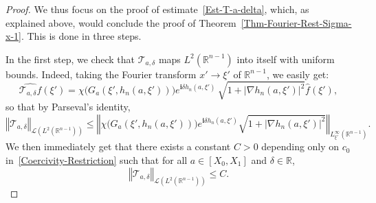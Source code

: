 \documentclass[AHL,Unicode,longabstracts]{cedram}
\newcommand{\scL}{\mathscr{L}}
\newcommand{\scT}{\mathscr{T}}
\newcommand*\R{\mathbb{R}}
\renewcommand{\i}{\mathbf{i}}
\newcommand{\norm}[1]{\left\Vert#1\right\Vert}
\renewcommand{\leq}{\leqslant}
\begin{document}
\begin{proof}
We thus focus on the proof of estimate~\eqref{Est-T-a-delta}, which, as explained above, would conclude the proof of Theorem~\ref{Thm-Fourier-Rest-Sigma-x-1}. This is done in three steps.

In the first step, we check that $\scT_{a, \delta}$ maps $L^2(\R^{n-1})$ into itself with uniform bounds. Indeed, taking the Fourier transform $x' \to \xi'$ of $\R^{n-1}$, we easily get:
\[
\widehat {\scT_{a, \delta} f}(\xi') =
\chi\big(G_a(\xi', h_n(a,\xi'))\big) e^{\i \delta h_n(a,\xi')}
\,
\sqrt{1 + \left|\nabla h_n(a,\xi')\right|^2}
\widehat {f} (\xi'),
\]
so that by Parseval's identity,
\[
\norm{
\scT_{a,\delta} }_{\scL\left(L^{2}\left(\R^{n-1}\right)\right)}
\leq
\norm{
\chi\big(G_a(\xi', h_n(a,\xi'))\big) e^{\i \delta h_n(a,\xi')}
\sqrt{1 + \left|\nabla h_n(a,\xi')\right|^2} }_{L^\infty_{\xi'}(\R^{n-1})}.
\]
We then immediately get that there exists a constant $C>0$ depending only on $c_0$ in~\eqref{Coercivity-Restriction} such that for all $a \in [X_0, X_1]$ and $\delta \in \R$,
\begin{equation}\label{Est-T-a-delta-L2-L2}
\norm{
\scT_{a,\delta} }_{\scL\left(L^{2}\left(\R^{n-1}\right)\right)}
\leqslant C.
\end{equation}


\end{proof}
\end{document}
